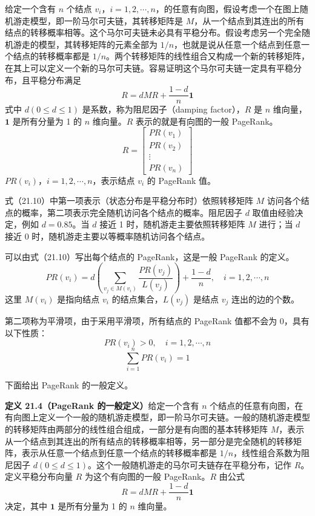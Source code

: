 \documentclass[UTF8, 12pt, fontset=fandol, oneside]{ctexart}
\begin{document}
给定一个含有 $n$ 个结点 $v_i$，$i=1,2,\cdots,n$，的任意有向图，假设考虑一个在图上随机游走模型，即一阶马尔可夫链，其转移矩阵是 $M$，从一个结点到其连出的所有结点的转移概率相等。这个马尔可夫链未必具有平稳分布。假设考虑另一个完全随机游走的模型，其转移矩阵的元素全部为 $1/n$，也就是说从任意一个结点到任意一个结点的转移概率都是 $1/n$。两个转移矩阵的线性组合又构成一个新的转移矩阵，在其上可以定义一个新的马尔可夫链。容易证明这个马尔可夫链一定具有平稳分布，且平稳分布满足
\begin{equation}
R=dMR+\frac{1-d}{n}\mathbf{1}
\tag{21.10}
\end{equation}
式中 $d(0\leqslant d\leqslant 1)$ 是系数，称为阻尼因子（damping factor），$R$ 是 $n$ 维向量，$\mathbf{1}$ 是所有分量为 1 的 $n$ 维向量。$R$ 表示的就是有向图的一般 PageRank。
\[
R=
\begin{bmatrix}
PR(v_1)\\
PR(v_2)\\
\vdots\\
PR(v_n)
\end{bmatrix}
\]
$PR(v_i)$，$i=1,2,\cdots,n$，表示结点 $v_i$ 的 PageRank 值。

式（21.10）中第一项表示（状态分布是平稳分布时）依照转移矩阵 $M$ 访问各个结点的概率，第二项表示完全随机访问各个结点的概率。阻尼因子 $d$ 取值由经验决定，例如 $d=0.85$。当 $d$ 接近 1 时，随机游走主要依照转移矩阵 $M$ 进行；当 $d$ 接近 0 时，随机游走主要以等概率随机访问各个结点。

可以由式（21.10）写出每个结点的 PageRank，这是一般 PageRank 的定义。
\begin{equation}
PR(v_i)=d\left(\sum_{v_j\in M(v_i)}\frac{PR(v_j)}{L(v_j)}\right)+\frac{1-d}{n},\quad i=1,2,\cdots,n
\tag{21.11}
\end{equation}
这里 $M(v_i)$ 是指向结点 $v_i$ 的结点集合，$L(v_j)$ 是结点 $v_j$ 连出的边的个数。

第二项称为平滑项，由于采用平滑项，所有结点的 PageRank 值都不会为 0，具有以下性质：
\begin{equation}
PR(v_i)>0,\quad i=1,2,\cdots,n
\tag{21.12}
\end{equation}
\begin{equation}
\sum_{i=1}^n PR(v_i)=1
\tag{21.13}
\end{equation}

下面给出 PageRank 的一般定义。

\noindent\textbf{定义 21.4（PageRank 的一般定义）}\quad 给定一个含有 $n$ 个结点的任意有向图，在有向图上定义一个一般的随机游走模型，即一阶马尔可夫链。一般的随机游走模型的转移矩阵由两部分的线性组合组成，一部分是有向图的基本转移矩阵 $M$，表示从一个结点到其连出的所有结点的转移概率相等，另一部分是完全随机的转移矩阵，表示从任意一个结点到任意一个结点的转移概率都是 $1/n$，线性组合系数为阻尼因子 $d(0\leqslant d\leqslant 1)$。这个一般随机游走的马尔可夫链存在平稳分布，记作 $R$。定义平稳分布向量 $R$ 为这个有向图的一般 PageRank。$R$ 由公式
\begin{equation}
R=dMR+\frac{1-d}{n}\mathbf{1}
\tag{21.14}
\end{equation}
决定，其中 $\mathbf{1}$ 是所有分量为 1 的 $n$ 维向量。
\end{document}
